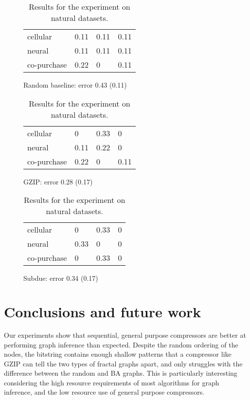 \documentclass{article}
\begin{document}
\begin{table}

\begin{subfigure}[b]{1\columnwidth}
\centering
\begin{tabular}{l | l l l }
\hline
  cellular      &  0.11 & 0.11 & 0.11 \\
  neural        &  0.11 & 0.11 & 0.11 \\
  co-purchase   &  0.22 & 0    & 0.11 \\
\hline
\end{tabular}
\caption{Random baseline: error 0.43 (0.11)}
\end{subfigure}
\vspace{3mm}

\begin{subfigure}[b]{1\columnwidth}
\centering
\begin{tabular}{l | l l l }
\hline
  cellular      &  0 & 0.33 & 0 \\
  neural        &  0.11 & 0.22 & 0 \\
  co-purchase   &  0.22 & 0 & 0.11 \\
\hline
\end{tabular}
\caption{GZIP: error 0.28 (0.17)}
\end{subfigure}
\vspace{3mm}

\begin{subfigure}[b]{1\columnwidth}
\centering
\begin{tabular}{l | l l l }
\hline
  cellular      &  0    & 0.33 & 0 \\
  neural        &  0.33 & 0    & 0 \\
  co-purchase   &  0    & 0.33 & 0 \\
\hline
\end{tabular}
\caption{Subdue: error 0.34 (0.17) }
\end{subfigure}
\caption{Results for the experiment on natural datasets.}
\label{table:real-life}
\end{table}

\section*{Conclusions and future work}

Our experiments show that sequential, general purpose compressors are better at performing graph inference than expected. Despite the random ordering of the nodes, the bitstring contains enough shallow patterns that a compressor like GZIP can tell the two types of fractal graphs apart, and only struggles with the difference between the random and BA graphs. This is particularly interesting considering the high resource requirements of most algorithms for graph inference, and the low resource use of general purpose compressors. 
\end{document}
